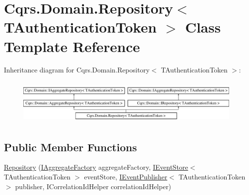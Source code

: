 \hypertarget{classCqrs_1_1Domain_1_1Repository}{}\section{Cqrs.\+Domain.\+Repository$<$ T\+Authentication\+Token $>$ Class Template Reference}
\label{classCqrs_1_1Domain_1_1Repository}
Inheritance diagram for Cqrs.\+Domain.\+Repository$<$ T\+Authentication\+Token $>$\+:\begin{figure}[H]
\begin{center}
\leavevmode
\includegraphics[height=2.288828cm]{classCqrs_1_1Domain_1_1Repository}
\end{center}
\end{figure}
\subsection*{Public Member Functions}
\begin{DoxyCompactItemize}
\item 
\hyperlink{classCqrs_1_1Domain_1_1Repository_ab513757cb27ab3f34a1cd4d5396aa0c1_ab513757cb27ab3f34a1cd4d5396aa0c1}{Repository} (\hyperlink{interfaceCqrs_1_1Domain_1_1Factories_1_1IAggregateFactory}{I\+Aggregate\+Factory} aggregate\+Factory, \hyperlink{interfaceCqrs_1_1Events_1_1IEventStore}{I\+Event\+Store}$<$ T\+Authentication\+Token $>$ event\+Store, \hyperlink{interfaceCqrs_1_1Events_1_1IEventPublisher}{I\+Event\+Publisher}$<$ T\+Authentication\+Token $>$ publisher, I\+Correlation\+Id\+Helper correlation\+Id\+Helper)
\end{DoxyCompactItemize}
